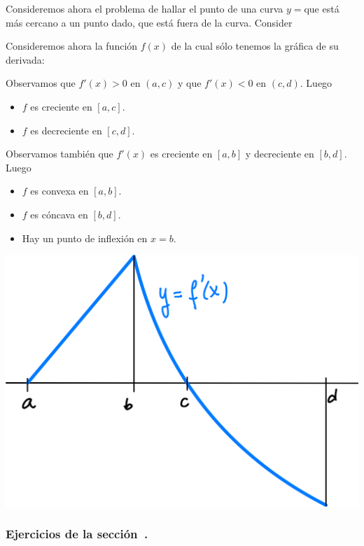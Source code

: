 \begin{example}
    Consideremos ahora el problema de hallar el punto de una curva $y=$que está más cercano a un punto dado, que está fuera de la curva.
    Consider
\end{example}
\begin{example}
    Consideremos ahora la función $f(x)$ de la cual sólo tenemos la gráfica de su derivada:

    \noindent
    \begin{minipage}{.5\textwidth}
        Observamos que $f'(x)>0$ en $(a,c)$ y que $f'(x)<0$ en $(c,d)$. Luego
        \begin{itemize}
            \item $f$ es creciente en $[a,c]$.
            \item $f$ es decreciente en $[c,d]$.
        \end{itemize}
        Observamos también que $f'(x)$ es creciente en $[a,b]$ y decreciente en $[b,d]$. Luego
        \begin{itemize}
            \item $f$ es convexa en $[a,b]$.
            \item $f$ es cóncava en $[b,d]$.
            \item Hay un punto de inflexión en $x=b$.
        \end{itemize}
        \end{minipage}
    \begin{minipage}{.5\textwidth}
        \centering
        \includegraphics[width=.9\textwidth]{pics/f-prima-ej-1.png}
    \end{minipage}
\end{example}

\subsubsection*{Ejercicios de la sección~.}


